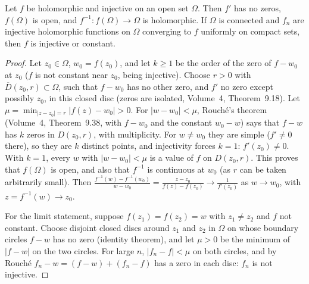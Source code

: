\begin{lemma}\label{lem:injective}
Let $f$ be holomorphic and injective on an open set $\Omega$. Then $f'$ has no zeros, $f(\Omega)$ is open, and $f^{-1}:f(\Omega)\to\Omega$ is holomorphic. If $\Omega$ is connected and $f_n$ are injective
holomorphic functions on $\Omega$ converging to $f$ uniformly on compact sets, then $f$ is injective or constant.
\end{lemma}
\begin{proof}
Let $z_0\in\Omega$, $w_0=f(z_0)$, and let $k\ge1$ be the order of the zero of $f-w_0$ at $z_0$ ($f$ is not constant near $z_0$, being injective). Choose $r>0$ with $\overline D(z_0,r)\subset\Omega$, such that $f-w_0$
has no other zero, and $f'$ no zero except possibly $z_0$, in this closed disc (zeros are isolated, Volume~4, Theorem~9.18). Let $\mu=\min_{|z-z_0|=r}|f(z)-w_0|>0$. For $|w-w_0|<\mu$, Rouch\'e's theorem
(Volume~4, Theorem~9.38, with $f-w_0$ and the constant $w_0-w$) says that $f-w$ has $k$ zeros in $D(z_0,r)$, with multiplicity. For $w\ne w_0$ they are simple ($f'\ne0$ there), so they are $k$
distinct points, and injectivity forces $k=1$: $f'(z_0)\ne0$. With $k=1$, every $w$ with $|w-w_0|<\mu$ is a value of $f$ on $D(z_0,r)$. This proves that $f(\Omega)$ is open, and also that
$f^{-1}$ is continuous at $w_0$ (as $r$ can be taken arbitrarily small). Then $\frac{f^{-1}(w)-f^{-1}(w_0)}{w-w_0}=\frac{z-z_0}{f(z)-f(z_0)}\to\frac1{f'(z_0)}$ as $w\to w_0$, with $z=f^{-1}(w)\to z_0$.

For the limit statement, suppose $f(z_1)=f(z_2)=w$ with $z_1\ne z_2$ and $f$ not constant. Choose disjoint closed discs around $z_1$ and $z_2$ in $\Omega$ on whose boundary circles $f-w$ has no zero
(identity theorem), and let $\mu>0$ be the minimum of $|f-w|$ on the two circles. For large $n$, $|f_n-f|<\mu$ on both circles, and by Rouch\'e $f_n-w=(f-w)+(f_n-f)$ has a zero in each disc: $f_n$ is not
injective.
\end{proof}

